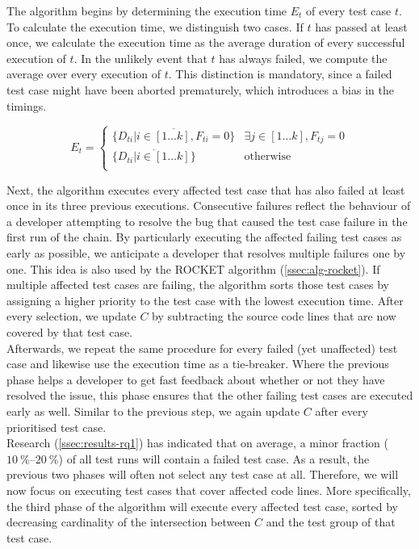 \noindent The algorithm begins by determining the execution time $E_t$ of every test case $t$. To calculate the execution time, we distinguish two cases. If $t$ has passed at least once, we calculate the execution time as the average duration of every successful execution of $t$. In the unlikely event that $t$ has always failed, we compute the average over every execution of $t$. This distinction is mandatory, since a failed test case might have been aborted prematurely, which introduces a bias in the timings.

\[
	E_t = \left.
	\begin{cases}
		\overline{\{D_{ti} \vert i \in [1 \dots k], F_{ti} = 0\}} & \exists j \in [1 \dots k], F_{tj} = 0 \\
		\overline{\{D_{ti} \vert i \in [1 \dots k]\}} & \text{otherwise} \\
	\end{cases}
	\right.
\]

\noindent Next, the algorithm executes every affected test case that has also failed at least once in its three previous executions. Consecutive failures reflect the behaviour of a developer attempting to resolve the bug that caused the test case failure in the first run of the chain. By particularly executing the affected failing test cases as early as possible, we anticipate a developer that resolves multiple failures one by one. This idea is also used by the ROCKET algorithm (\cref{ssec:alg-rocket}). If multiple affected test cases are failing, the algorithm sorts those test cases by assigning a higher priority to the test case with the lowest execution time. After every selection, we update $C$ by subtracting the source code lines that are now covered by that test case.\\

\noindent Afterwards, we repeat the same procedure for every failed (yet unaffected) test case and likewise use the execution time as a tie-breaker. Where the previous phase helps a developer to get fast feedback about whether or not they have resolved the issue, this phase ensures that the other failing test cases are executed early as well. Similar to the previous step, we again update $C$ after every prioritised test case.\\

\noindent Research (\cref{ssec:results-rq1}) has indicated that on average, a minor fraction ($\SIrange{10}{20}{\percent}$) of all test runs will contain a failed test case. As a result, the previous two phases will often not select any test case at all. Therefore, we will now focus on executing test cases that cover affected code lines. More specifically, the third phase of the algorithm will execute every affected test case, sorted by decreasing cardinality of the intersection between $C$ and the test group of that test case. 

